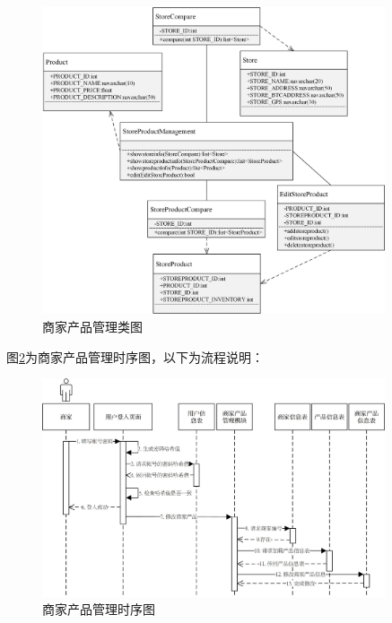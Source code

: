 	\begin{figure}[!htbp]
		\centering
		\includegraphics[width = 0.9\textwidth]{c2.jpg}
		\caption{商家产品管理类图}\label{c2}
	\end{figure}

	图\ref{time3}为商家产品管理时序图，以下为流程说明：

	\begin{figure}[!htbp]
		\centering
		\includegraphics[width = 0.9\textwidth]{time3.jpg}
		\caption{商家产品管理时序图}\label{time3}
	\end{figure}

